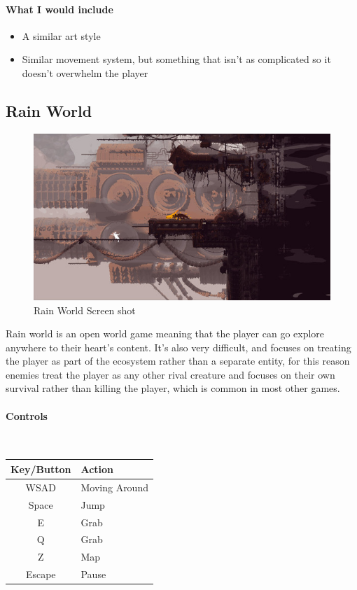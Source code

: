 \documentclass{article}
\newcommand{\myparagraph}[1]{\paragraph{#1}\mbox{}\\} %
\begin{document}
\paragraph{What I would include}
\begin{itemize}
\item A similar art style 
\item Similar movement system, but something that isn't as complicated so it doesn't overwhelm the player
\end{itemize}

\pagebreak

\subsection{Rain World}
\begin{figure}[h]
\includegraphics[width=\linewidth]{Rain world ss}
\caption{\cite{RWss} Rain World Screen shot}
\end{figure}
Rain world is an open world game meaning that the player can go explore anywhere to their heart's content. It's also very difficult, and focuses on treating the player as part of the ecosystem rather than a separate entity, for this reason enemies treat the player as any other rival creature and focuses on their own survival rather than killing the player, which is common in most other games.

\myparagraph{Controls}
\begin{tabular}{c|l}
Key/Button & Action        \\ \hline
WSAD       & Moving Around \\
Space      & Jump          \\
E          & Grab          \\
Q          & Grab          \\
Z          & Map           \\
Escape     & Pause        
\end{tabular}
\end{document}
